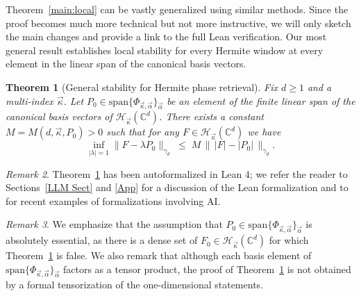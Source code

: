 \documentclass[11pt]{amsart}
\newtheorem{theorem}{Theorem}[section]
\theoremstyle{remark}
\newtheorem{remark}[theorem]{Remark}
\begin{document}
Theorem~\ref{main:local} can be vastly generalized using similar methods. Since the proof becomes much more technical but not more instructive, we will only sketch the main changes and provide a link to the full Lean verification. Our most general result establishes local stability for every Hermite window at every element in the linear span of the canonical basis vectors.
\begin{theorem}[General stability for Hermite phase retrieval]\label{thm:local_Gen}
Fix $d\geq 1$ and a multi-index $\vec\kappa$. Let $P_0\in \text{span} \{\Phi_{\vec \kappa,\vec\alpha}\}_{\vec \alpha}$ be an element of the finite linear span of the canonical basis vectors of $\mathcal{H}_{\vec\kappa}(\mathbb{C}^d)$. There exists a constant $M=M(d,\vec\kappa,P_0)>0$ such
that for any $F\in \mathcal{H}_{\vec\kappa}(\mathbb{C}^d)$ we have
\[
\inf_{|\lambda|=1}\lVert F - \lambda P_0 \rVert_{\gamma_d}
\;\le\;
M\,
\bigl\|\, \lvert F  \rvert - |P_0| \,\bigr\|_{\gamma_d}.
\]
\end{theorem}
\begin{remark}
    Theorem~\ref{thm:local_Gen} has been autoformalized in Lean 4; we refer the reader to Sections~\ref{LLM Sect} and \ref{App} for a discussion of the Lean formalization and to \cite{angdinata2026abc,armstrong2026formalization,hariharan2026milestone,ho2026generalization,ilin2026semi} for recent examples of formalizations involving AI. 
\end{remark}
\begin{remark}
     We emphasize that the assumption that $P_0\in\text{span}\{\Phi_{\vec \kappa,\vec\alpha}\}_{\vec \alpha}$ is absolutely essential, as there is a dense set of $F_0\in\mathcal{H}_{\vec\kappa}(\mathbb{C}^d)$ for which 
    Theorem~\ref{thm:local_Gen} is false. We also remark that although each basis
element of $\text{span}\{\Phi_{\vec \kappa,\vec\alpha}\}_{\vec \alpha}$ factors as a tensor product, the proof of Theorem~\ref{thm:local_Gen} is not obtained by a formal tensorization of the one-dimensional statements. 
\end{remark}
\end{document}

